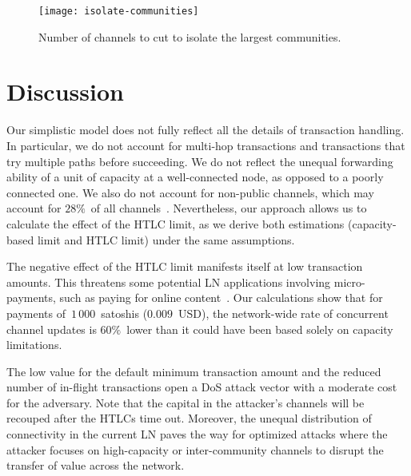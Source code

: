 \begin{figure}[tb]
	\centering
	\texttt{[image: isolate-communities]}
	\caption{Number of channels to cut to isolate the largest communities.}
	\label{fig:isolate-communities}
\end{figure}


\section{Discussion}
Our simplistic model does not fully reflect all the details of transaction handling.
In particular, we do not account for multi-hop transactions and transactions that try multiple paths before succeeding.
We do not reflect the unequal forwarding ability of a unit of capacity at a well-connected node, as opposed to a poorly connected one.
We also do not account for non-public channels, which may account for $28\%$~of all channels~\cite{BitMEXPrivateChannels}.
Nevertheless, our approach allows us to calculate the effect of the HTLC limit, as we derive both estimations (capacity-based limit and HTLC limit)  under the same assumptions.

The negative effect of the HTLC limit manifests itself at low transaction amounts.
This threatens some potential LN applications involving micro-payments, such as paying for online content~\cite{Poon2016}.
Our calculations show that for payments of~$1\,000$~satoshis ($0.009$~USD), the network-wide rate of concurrent channel updates is $60\%$~lower than it could have been based solely on capacity limitations.

The low value for the default minimum transaction amount and the reduced number of in-flight transactions open a DoS attack vector with a moderate cost for the adversary.
Note that the capital in the attacker's channels will be recouped after the HTLCs time out.
Moreover, the unequal distribution of connectivity in the current LN paves the way for optimized attacks where the attacker focuses on high-capacity or inter-community channels to disrupt the transfer of value across the network.


